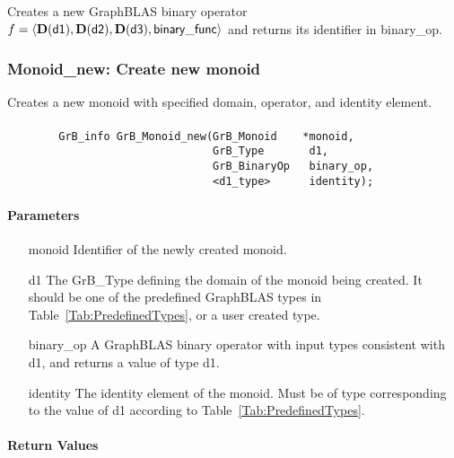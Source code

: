 Creates a new GraphBLAS binary operator $f = \langle \bold{D}({\sf d1}), 
\bold{D}({\sf d2}), \bold{D}({\sf d3}), {\sf binary\_func} \rangle$ and returns its identifier in {\sf binary\_op}.




\subsubsection{{\sf Monoid\_new}: Create new monoid}

Creates a new monoid with specified domain, operator, and identity element.

\paragraph{\syntax}

\begin{verbatim}
        GrB_info GrB_Monoid_new(GrB_Monoid    *monoid,
                                GrB_Type       d1,
                                GrB_BinaryOp   binary_op,
                                <d1_type>      identity);
\end{verbatim}

\paragraph{Parameters}

\begin{itemize}[leftmargin=1.1in]
    \item[{\sf monoid}]         Identifier of the newly created monoid.
    \item[{\sf d1}]     The {\sf GrB\_Type} defining the domain of the monoid 
    being created. It should be one of the predefined GraphBLAS types in
    Table~\ref{Tab:PredefinedTypes}, or a user created type.
    \item[{\sf binary\_op}]     A GraphBLAS binary operator with input types consistent
    with {\sf d1}, and returns a value of type {\sf d1}.
    \item[{\sf identity}]       The identity element of the monoid. 
    Must be of type corresponding to the value of {\sf d1} according to
    Table~\ref{Tab:PredefinedTypes}.
\end{itemize}

\paragraph{Return Values}

